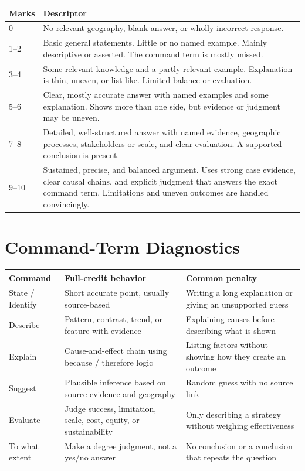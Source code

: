 \documentclass[11pt,a4paper]{article}
\begin{document}
\begin{tabularx}{\textwidth}{L{0.14\textwidth}Y}
\toprule
\textbf{Marks} & \textbf{Descriptor} \\
 & No relevant geography, blank answer, or wholly incorrect response. \\
1--2 & Basic general statements. Little or no named example. Mainly
descriptive or asserted. The command term is mostly missed. \\
3--4 & Some relevant knowledge and a partly relevant example. Explanation is
thin, uneven, or list-like. Limited balance or evaluation. \\
5--6 & Clear, mostly accurate answer with named examples and some explanation.
Shows more than one side, but evidence or judgment may be uneven. \\
7--8 & Detailed, well-structured answer with named evidence, geographic
processes, stakeholders or scale, and clear evaluation. A supported conclusion
is present. \\
9--10 & Sustained, precise, and balanced argument. Uses strong case evidence,
clear causal chains, and explicit judgment that answers the exact command term.
Limitations and uneven outcomes are handled convincingly. \\
\bottomrule
\end{tabularx}

\section{Command-Term Diagnostics}

\begin{tabularx}{\textwidth}{L{0.18\textwidth}Y Y}
\toprule
\textbf{Command} & \textbf{Full-credit behavior} & \textbf{Common penalty} \\
\midrule
State / Identify & Short accurate point, usually source-based & Writing a
long explanation or giving an unsupported guess \\
Describe & Pattern, contrast, trend, or feature with evidence & Explaining
causes before describing what is shown \\
Explain & Cause-and-effect chain using because / therefore logic & Listing
factors without showing how they create an outcome \\
Suggest & Plausible inference based on source evidence and geography & Random
guess with no source link \\
Evaluate & Judge success, limitation, scale, cost, equity, or sustainability &
Only describing a strategy without weighing effectiveness \\
To what extent & Make a degree judgment, not a yes/no answer & No conclusion
or a conclusion that repeats the question \\
\bottomrule
\end{tabularx}
\end{document}
